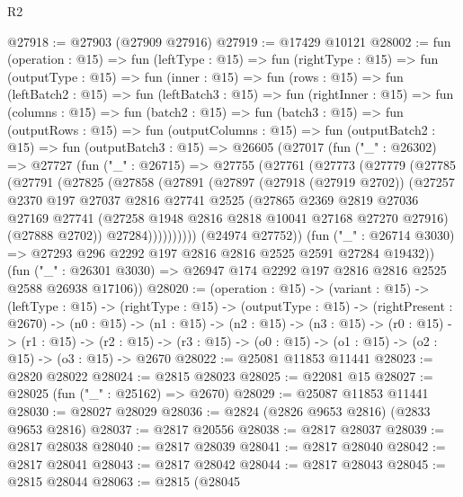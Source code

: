 \begin{lexlean}{R2}
\begin{coremodule}
@27918 := @27903 (@27909 @27916)
@27919 := @17429 @10121
@28002 := fun (operation : @15) =>
  fun (leftType : @15) =>
  fun (rightType : @15) =>
  fun (outputType : @15) =>
  fun (inner : @15) =>
  fun (rows : @15) =>
  fun (leftBatch2 : @15) =>
  fun (leftBatch3 : @15) =>
  fun (rightInner : @15) =>
  fun (columns : @15) =>
  fun (batch2 : @15) =>
  fun (batch3 : @15) =>
  fun (outputRows : @15) =>
  fun (outputColumns : @15) =>
  fun (outputBatch2 : @15) =>
  fun (outputBatch3 : @15) =>
  @26605
    (@27017
      (fun ("_" : @26302) =>
      @27727
        (fun ("_" : @26715) =>
        @27755
          (@27761
            (@27773
              (@27779
                (@27785
                  (@27791
                    (@27825
                      (@27858
                        (@27891
                          (@27897
                            (@27918 (@27919 @2702))
                            (@27257
                              @2370
                              @197
                              @27037
                              @2816
                              @27741
                              @2525
                              (@27865
                                @2369
                                @2819
                                @27036
                                @27169
                                @27741
                                (@27258 @1948 @2816 @2818 @10041 @27168 @27270 @27916)
                                (@27888 @2702))
                              @27284))))))))))
          (@24974 @27752))
        (fun ("_" : @26714 @3030) => @27293 @296 @2292 @197 @2816 @2816 @2525 @2591 @27284 @19432))
      (fun ("_" : @26301 @3030) => @26947 @174 @2292 @197 @2816 @2816 @2525 @2588 @26938 @17106))
@28020 := (operation : @15) ->
  (variant : @15) ->
  (leftType : @15) ->
  (rightType : @15) ->
  (outputType : @15) ->
  (rightPresent : @2670) ->
  (n0 : @15) ->
  (n1 : @15) ->
  (n2 : @15) ->
  (n3 : @15) ->
  (r0 : @15) ->
  (r1 : @15) ->
  (r2 : @15) -> (r3 : @15) -> (o0 : @15) -> (o1 : @15) -> (o2 : @15) -> (o3 : @15) -> @2670
@28022 := @25081 @11853 @11441
@28023 := @2820 @28022
@28024 := @2815 @28023
@28025 := @22081 @15
@28027 := @28025 (fun ("_" : @25162) => @2670)
@28029 := @25087 @11853 @11441
@28030 := @28027 @28029
@28036 := @2824 (@2826 @9653 @2816) (@2833 @9653 @2816)
@28037 := @2817 @20556
@28038 := @2817 @28037
@28039 := @2817 @28038
@28040 := @2817 @28039
@28041 := @2817 @28040
@28042 := @2817 @28041
@28043 := @2817 @28042
@28044 := @2817 @28043
@28045 := @2815 @28044
@28063 := @2815
    (@28045

\end{coremodule}
\end{lexlean}
